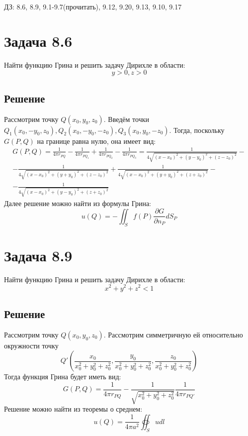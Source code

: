 \documentclass[11pt]{article}
\author{Sergey Makarov}
\date{\today}
\title{}
\def\zall{\setcounter{lem}{0}\setcounter{cnsqnc}{0}\setcounter{th}{0}\setcounter{Cmt}{0}\setcounter{equation}{0}}
\newcounter{lem}\setcounter{lem}{0}
\newcounter{th}\setcounter{th}{0}
\newcounter{cnsqnc}\setcounter{cnsqnc}{0}
\newcounter{Cmt}\setcounter{Cmt}{0}
\begin{document}
\zall

ДЗ: 8.6, 8.9, 9.1-9.7(прочитать), 9.12, 9.20, 9.13, 9.10, 9.17
\section{Задача 8.6}
\label{sec:org005edef}
Найти функцию Грина и решить задачу Дирихле в области:
\begin{equation}
y > 0, z > 0
\end{equation}
\subsection{Решение}
\label{sec:org5834be6}
Рассмотрим точку $Q(x_0, y_0, z_0)$. Введём точки $Q_1(x_0, -y_0, z_0), Q_2(x_0, -y_0, -z_0), Q_3(x_0, y_0, -z_0)$.
Тогда, поскольку $G(P, Q)$ на границе равна нулю, она имеет вид:
\begin{multline}
G(P, Q) = \frac1{4\pi r_{PQ}} - \frac1{4\pi r_{PQ_1}} + \frac1{4\pi r_{PQ_2}} - \frac1{4\pi r_{PQ_3}} =
\frac1{4\sqrt{(x - x_0)^2 + (y - y_0)^2 + (z - z_0)^2}} - \\
- \frac1{4\sqrt{(x - x_0)^2 + (y + y_0)^2 + (z - z_0)^2}} +
\frac1{4\sqrt{(x - x_0)^2 + (y + y_0)^2 + (z + z_0)^2}} - \\
- \frac1{4\sqrt{(x - x_0)^2 + (y - y_0)^2 + (z + z_0)^2}}
\end{multline}
Далее решение можно найти из формулы Грина:
\begin{equation}
u(Q) = -\iint_Sf(P)\frac{\partial G}{\partial n_P}dS_P
\end{equation}
\section{Задача 8.9}
\label{sec:orga395a55}
Найти функцию Грина и решить задачу Дирихле в области:
\begin{equation}
x^2 + y^2 + z^2 < 1
\end{equation}
\subsection{Решение}
\label{sec:org06df165}
Рассмотрим точку $Q(x_0, y_0, z_0)$. Рассмотрим симметричную ей относительно окружности точку
$$Q'\left(\frac{x_0}{x_0^2 + y_0^2 + z_0^2}, \frac{y_0}{x_0^2 + y_0^2 + z_0^2}, \frac{z_0}{x_0^2 + y_0^2 + z_0^2}\right)$$
Тогда функция Грина будет иметь вид:
\begin{equation}
G(P, Q) = \frac1{4\pi r_{PQ}} - \frac1{\sqrt{x_0^2 + y_0^2 + z_0^2}}\frac1{4\pi r_{PQ'}}
\end{equation}
Решение можно найти из теоремы о среднем:
\begin{equation}
u(Q) = \frac1{4\pi a^2}\oiint_Sudl
\end{equation}
\end{document}
